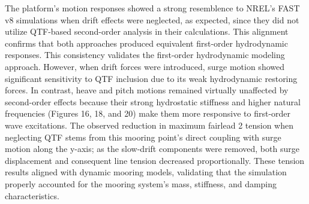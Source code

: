 \documentclass[a4paper, 11pt]{article}
\begin{document}
The platform's motion responses showed a strong resemblence to NREL's FAST v8 simulations when drift effects were neglected, as expected, since they did not utilize QTF-based second-order analysis in their calculations. This alignment confirms that both approaches produced equivalent first-order hydrodynamic responses. This consistency validates the first-order hydrodynamic modeling approach. However, when drift forces were introduced, surge motion showed significant sensitivity to QTF inclusion due to its weak hydrodynamic restoring forces. In contrast, heave and pitch motions remained virtually unaffected by second-order effects because their strong hydrostatic stiffness and higher natural frequencies (Figures 16, 18, and 20) make them more responsive to first-order wave excitations. The observed reduction in maximum fairlead 2 tension when neglecting QTF stems from this mooring point's direct coupling with surge motion along the y-axis; as the slow-drift components were removed, both surge displacement and consequent line tension decreased proportionally. These tension results aligned with dynamic mooring models, validating that the simulation properly accounted for the mooring system's mass, stiffness, and damping characteristics.
\end{document}
